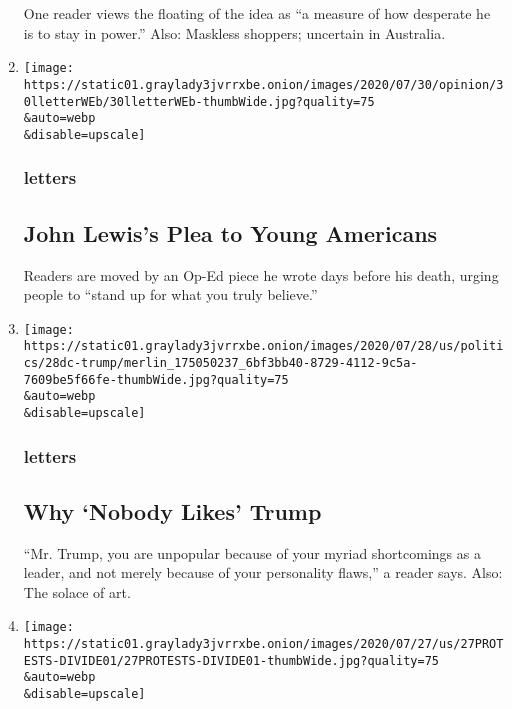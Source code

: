 \begin{enumerate}
  One reader views the floating of the idea as ``a measure of how
  desperate he is to stay in power.'' Also: Maskless shoppers; uncertain
  in Australia.
\item
  \href{/2020/07/30/opinion/letters/john-lewis-civil-rights.html}{}

  \texttt{[image: https://static01.graylady3jvrrxbe.onion/images/2020/07/30/opinion/30lletterWEb/30lletterWEb-thumbWide.jpg?quality=75\\\&auto=webp\\\&disable=upscale]}

  \hypertarget{letters-5}{%
  \subsubsection{letters}\label{letters-5}}

  \hypertarget{john-lewiss-plea-to-young-americans}{%
  \subsection{John Lewis's Plea to Young
  Americans}\label{john-lewiss-plea-to-young-americans}}

  Readers are moved by an Op-Ed piece he wrote days before his death,
  urging people to ``stand up for what you truly believe.''
\item
  \href{/2020/07/30/opinion/letters/trump-personality.html}{}

  \texttt{[image: https://static01.graylady3jvrrxbe.onion/images/2020/07/28/us/politics/28dc-trump/merlin\_175050237\_6bf3bb40-8729-4112-9c5a-7609be5f66fe-thumbWide.jpg?quality=75\\\&auto=webp\\\&disable=upscale]}

  \hypertarget{letters-6}{%
  \subsubsection{letters}\label{letters-6}}

  \hypertarget{why-nobody-likes-trump}{%
  \subsection{Why `Nobody Likes' Trump}\label{why-nobody-likes-trump}}

  ``Mr. Trump, you are unpopular because of your myriad shortcomings as
  a leader, and not merely because of your personality flaws,'' a reader
  says. Also: The solace of art.
\item
  \href{/2020/07/29/opinion/letters/protests-portland.html}{}

  \texttt{[image: https://static01.graylady3jvrrxbe.onion/images/2020/07/27/us/27PROTESTS-DIVIDE01/27PROTESTS-DIVIDE01-thumbWide.jpg?quality=75\\\&auto=webp\\\&disable=upscale]}


\end{enumerate}
